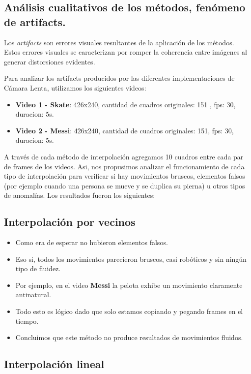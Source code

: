 \subsection{Análisis cualitativos de los métodos, fenómeno de artifacts.}
Los \textit{artifacts} son errores visuales resultantes de la aplicación de los métodos. Estos errores visuales se caracterizan por romper la coherencia entre imágenes al generar distorsiones evidentes.

Para analizar los artifacts producidos por las diferentes implementaciones de Cámara Lenta, utilizamos los siguientes videos:

\begin{itemize}
  \item \textbf{Video 1 - Skate}: 426x240, cantidad de cuadros originales: 151 , fps: 30, duracion: 5s.
  \item \textbf{Video 2 - Messi}: 426x240, cantidad de cuadros originales: 151, fps: 30, duracion: 5s.
\end{itemize}

A través de cada método de interpolación agregamos 10 cuadros entre cada par de frames de los videos.
Asi, nos propusimos analizar el funcionamiento de cada tipo de interpolación para verificar si hay movimientos bruscos, elementos falsos (por ejemplo cuando una persona se mueve y se duplica su pierna) u otros tipos de anomalías.
Los resultados fueron los siguientes:

\subsection{Interpolación por vecinos}

\begin{itemize}
\item Como era de esperar no hubieron elementos falsos.
\item Eso si, todos los movimientos parecieron bruscos, casi robóticos y sin ningún tipo de fluidez.
\item Por ejemplo, en el video \textbf{Messi} la pelota exhibe un movimiento claramente antinatural.
\item Todo esto es lógico dado que solo estamos copiando y pegando frames en el tiempo.
\item Concluimos que este método no produce resultados de movimientos fluidos.
\end{itemize}

\subsection{Interpolación lineal}

